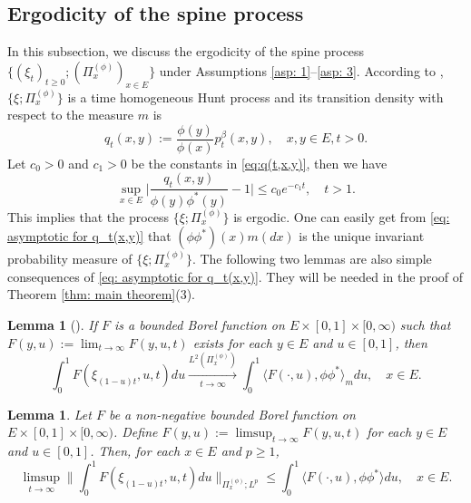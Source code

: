 \documentclass[12pt, a4paper]{amsart}
\newtheorem{lem}[thm]{Lemma}
\theoremstyle{definition}
\numberwithin{equation}{section}
\begin{document}
\subsection{Ergodicity of the spine process}
\label{sec: Ergodicity}
	In this subsection, we discuss the ergodicity of the spine process $\{(\xi_t)_{t\geq 0}; (\Pi^{(\phi)}_x)_{x\in E}\}$ under Assumptions \ref{asp: 1}--\ref{asp: 3}.
	According to \cite{KimSong2008Intrinsic}, $\{\xi; \Pi^{(\phi)}_x\}$ is a time homogeneous Hunt process and its transition density with respect to the measure $m$ is
\begin{equation}
	q_t(x,y) := \frac{\phi(y)}{\phi(x)} p^\beta_t(x,y),
	\quad x,y\in E, t>0.
\end{equation}
	Let $c_0>0$ and $c_1>0$ be the constants  in \eqref{eq:q(t,x,y)}, then we have
\begin{equation}\label{eq: asymptotic for q_t(x,y)}
	\sup_{x\in E} \Big| \frac{q_t(x,y)}{\phi(y)\phi^*(y)} - 1\Big|
	\leq c_0 e^{-c_1 t},
	\quad t > 1.
\end{equation}
	This implies that the process $\{\xi; \Pi^{(\phi)}_x\}$ is ergodic.
	One can easily get from \eqref{eq: asymptotic for q_t(x,y)} that $(\phi\phi^*)(x)m(dx)$ is the unique invariant probability measure of $\{\xi; \Pi^{(\phi)}_x\}$.
	The following two lemmas are also simple consequences of \eqref{eq: asymptotic for q_t(x,y)}.
	They will be needed in the proof of  Theorem \ref{thm: main theorem}(3).
\begin{lem}[{\cite[Lemma 5.6]{RenSongSun2017Spine}}] \label{lem: ergodicity of the underlying process}
	If $F$ is a bounded Borel function on $E\times [0,1]\times [0,\infty)$ such that $F(y,u):= \lim_{t\to \infty} F(y,u,t)$ exists for each $y\in E$ and $u \in [0,1]$, 
	then
\begin{equation}
	\int_0^1 F(\xi_{(1-u)t},u,t) du
	\xrightarrow[t\to \infty]{ L^2(\Pi_x^{(\phi)})}
	\int_0^1 \langle F(\cdot , u), \phi\phi^*\rangle_m du,
	\quad x\in E.
\end{equation}
\end{lem}
\begin{lem}\label{lem: Fatou-ergodic lemma for the uderlying process}
	Let $F$ be a non-negative bounded Borel function on $E\times [0,1]\times [0,\infty)$.
	Define $F(y,u):= \limsup_{t\to \infty} F(y,u,t)$ for each $y\in E$ and $u \in [0,1]$.
	Then, for each $x\in E$ and $p \geq 1$, %
\begin{equation}
	\limsup_{ t \to \infty}  \Big\| \int_0^1 F(\xi_{(1-u) t },u,t) du  \Big\|_{\Pi_x^{(\phi)};L^p}
	\leq \int_0^1 \langle F(\cdot, u), \phi \phi^*\rangle du,
	\quad x\in E.
\end{equation}
\end{lem}
\end{document}
